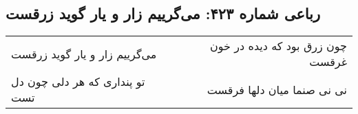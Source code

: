 \begin{center}
\section*{رباعی شماره ۴۲۳: می‌گرییم زار و یار گوید زرقست}
\label{sec:0423}
\begin{longtable}{l p{0.5cm} r}
می‌گرییم زار و یار گوید زرقست
&&
چون زرق بود که دیده در خون غرقست
\\
تو پنداری که هر دلی چون دل تست
&&
نی نی صنما میان دلها فرقست
\\
\end{longtable}
\end{center}
